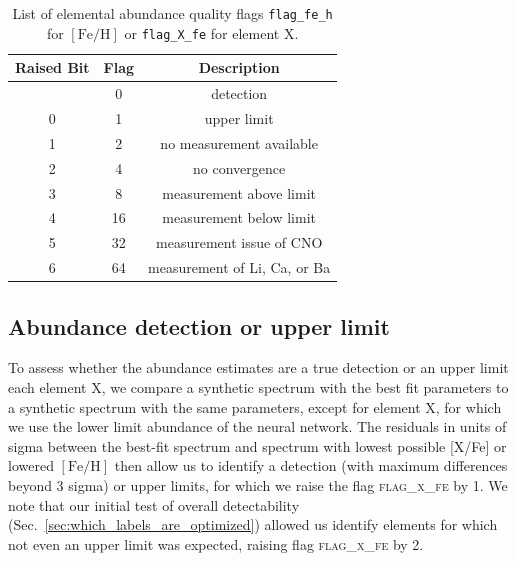 \documentclass[
  journal=pasa,
  manuscript=research-paper, %
  year=2024,
  volume=37
]{cup-journal}
\newcommand{\feh}{$\mathrm{[Fe/H]}$\xspace}
\begin{document}
\begin{table}
\centering
\caption{List of elemental abundance quality flags \texttt{flag\_fe\_h} for \feh or \texttt{flag\_X\_fe} for element X.}
\label{tab:flag_x_fe}
\begin{tabular}{ccc}
\hline \hline
Raised Bit & Flag & Description \\
\hline
  & 0 & detection \\ 
0 & 1 & upper limit \\ 
1 & 2 & no measurement available\\
2 & 4 & no convergence\\
3 & 8 & measurement above limit\\
4 & 16 & measurement below limit\\
5 & 32 & measurement issue of CNO \\
6 & 64 & measurement of Li, Ca, or Ba \\ %
\hline
\end{tabular}
\end{table}

\subsection{Abundance detection or upper limit}
\label{sec:abundance_detection_or_upper_limit}

To assess whether the abundance estimates are a true detection or an upper limit each element X, we compare a synthetic spectrum with the best fit parameters to a synthetic spectrum with the same parameters, except for element X, for which we use the lower limit abundance of the neural network. The residuals in units of sigma between the best-fit spectrum and spectrum with lowest possible [X/Fe] or lowered \feh then allow us to identify a detection (with maximum differences beyond 3 sigma) or upper limits, for which we raise the flag \textsc{flag\_x\_fe} by 1. We note that our initial test of overall detectability (Sec.~\ref{sec:which_labels_are_optimized}) allowed us identify elements for which not even an upper limit was expected, raising flag \textsc{flag\_x\_fe} by 2.
\end{document}
